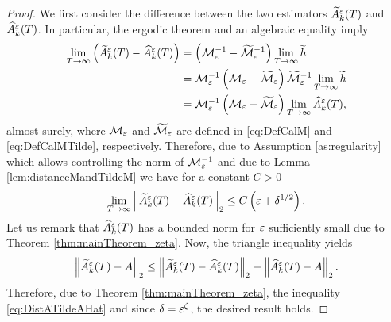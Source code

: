 \documentclass[10pt]{article}
\begin{document}
\begin{proof} We first consider the difference between the two estimators $\widetilde A^\varepsilon_k(T)$ and $\widehat A^\varepsilon_k(T)$. In particular, the ergodic theorem and an algebraic equality imply
	\begin{equation}
	\begin{aligned}
	\lim_{T \to \infty} \left(\widetilde A^\varepsilon_k(T) - \widehat A^\varepsilon_k(T)\right) &= \left(\mathcal M_\varepsilon^{-1} - \widetilde{\mathcal M}_\varepsilon^{-1}\right) \lim_{T \to \infty}\widetilde h \\
	&= \mathcal M_\varepsilon^{-1}\left(\mathcal M_\varepsilon - \widetilde{\mathcal M}_\varepsilon\right)  \widetilde{\mathcal M}_\varepsilon^{-1} \lim_{T \to \infty} \widetilde h\\
	&= \mathcal M_\varepsilon^{-1}\left(\mathcal M_\varepsilon - \widetilde{\mathcal M}_\varepsilon\right)\lim_{T \to \infty} \widehat A^\varepsilon_k(T),
	\end{aligned}
	\end{equation}
	almost surely, where $\mathcal M_\varepsilon$ and $\widetilde{\mathcal M}_\varepsilon$ are defined in \eqref{eq:DefCalM} and \eqref{eq:DefCalMTilde}, respectively. Therefore, due to Assumption \ref{as:regularity} which allows controlling the norm of $\mathcal M_\varepsilon^{-1}$ and due to Lemma \ref{lem:distanceMandTildeM} we have for a constant $C > 0$
	\begin{equation}\label{eq:DistATildeAHat}
	\lim_{T \to \infty} \left\|\widetilde A^\varepsilon_k(T) - \widehat A^\varepsilon_k(T)\right\|_2 \leq C \left(\varepsilon + \delta^{1/2} \right).
	\end{equation}
	Let us remark that $\widehat A^\varepsilon_k(T)$ has a bounded norm for $\varepsilon$ sufficiently small due to Theorem \ref{thm:mainTheorem_zeta}. Now, the triangle inequality yields
	\begin{equation}
	\left\|\widetilde A^\varepsilon_k(T) - A\right\|_2 \leq \left\|\widetilde A^\varepsilon_k(T) - \widehat A^\varepsilon_k(T)\right\|_2 + \left\|\widehat A^\varepsilon_k(T) - A\right\|_2.
	\end{equation}
	Therefore, due to Theorem \ref{thm:mainTheorem_zeta}, the inequality \eqref{eq:DistATildeAHat} and since $\delta = \varepsilon^\zeta$, the desired result holds.
\end{proof}
\end{document}
